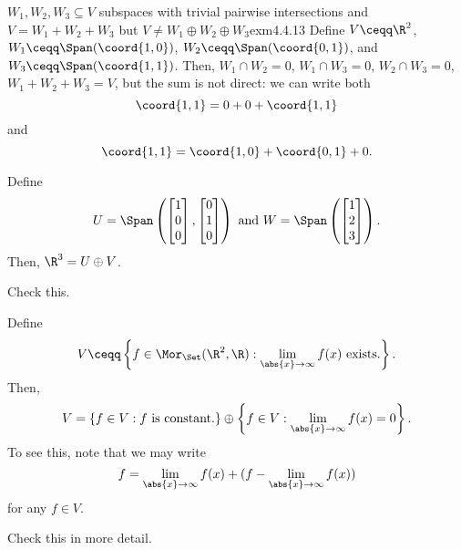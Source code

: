 \begin{exm}{$W_1,W_2,W_3\subseteq V$ subspaces with trivial pairwise intersections and $V=W_1+W_2+W_3$ but $V\neq W_1\oplus W_2\oplus W_3$}{exm4.4.13}
	Define $V\ceqq \R ^2$, $W_1\ceqq \Span (\coord{1,0})$, $W_2\ceqq \Span (\coord{0,1})$, and $W_3\ceqq \Span (\coord{1,1})$.  Then, $W_1\cap W_2=0$, $W_1\cap W_3=0$, $W_2\cap W_3=0$, $W_1+W_2+W_3=V$, but the sum is not direct:  we can write both
	\begin{equation}
		\coord{1,1}=0+0+\coord{1,1}
	\end{equation}
	and
	\begin{equation}
		\coord{1,1}=\coord{1,0}+\coord{0,1}+0.
	\end{equation}
\end{exm}
\begin{exm}{}{}
	Define
	\begin{equation}
	U=\Span \left( \begin{bmatrix}1 \\ 0 \\ 0\end{bmatrix},\begin{bmatrix}0 \\ 1 \\ 0\end{bmatrix}\right) \text{ and }W=\Span \left( \begin{bmatrix}1 \\ 2 \\ 3\end{bmatrix}\right) .
	\end{equation}
	Then, $\R ^3=U\oplus V$.
	\begin{exr}[breakable=false]{}{}
		Check this.
	\end{exr}
\end{exm}
\begin{exm}{}{}
	Define
	\begin{equation}
	V\ceqq \left\{ f\in \Mor _{\Set}(\R ^2,\R ):\lim _{\abs{x}\to \infty}f(x)\text{ exists.}\right\} .
	\end{equation}
	Then,
	\begin{equation}
	V=\left\{ f\in V:f\text{ is constant.}\right\} \oplus \left\{ f\in V:\lim _{\abs{x}\to \infty}f(x)=0\right\} .
	\end{equation}
	To see this, note that we may write
	\begin{equation}
	f=\lim _{\abs{x}\to \infty}f(x)+(f-\lim _{\abs{x}\to \infty}f(x))
	\end{equation}
	for any $f\in V$.
	\begin{exr}[breakable=false]{}{}
		Check this in more detail.
	\end{exr}
\end{exm}

